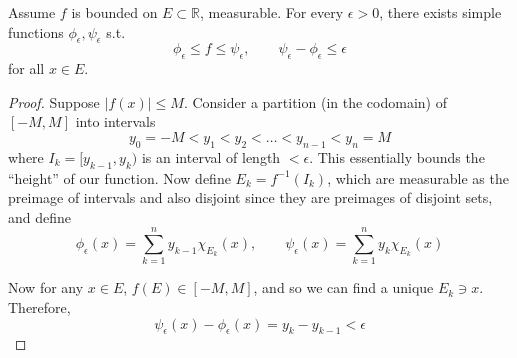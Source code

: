   \begin{lemma}
    Assume $f$ is bounded on $E \subset \mathbb{R}$, measurable. For every $\epsilon > 0$, there exists simple functions $\phi_\epsilon, \psi_\epsilon$ s.t. 
    \begin{equation}
      \phi_\epsilon \leq f \leq \psi_\epsilon, \qquad \psi_\epsilon - \phi_\epsilon \leq \epsilon
    \end{equation}
    for all $x \in E$. 
  \end{lemma}
  \begin{proof}
    Suppose $|f(x)| \leq M$. Consider a partition (in the codomain) of $[-M, M]$ into intervals 
    \begin{equation}
      y_0 = -M < y_1 < y_2 < \ldots < y_{n-1} < y_n = M
    \end{equation}
    where $I_k = [y_{k-1}, y_k)$ is an interval of length $< \epsilon$. This essentially bounds the ``height'' of our function. Now define $E_k = f^{-1} (I_k)$, which are measurable as the preimage of intervals and also disjoint since they are preimages of disjoint sets, and define 
    \begin{equation}
      \phi_\epsilon(x) = \sum_{k=1}^n y_{k-1} \chi_{E_k} (x) , \qquad \psi_\epsilon (x) = \sum_{k=1}^n y_k \chi_{E_k} (x) 
    \end{equation}

    Now for any $x \in E$, $f(E) \in [-M, M]$, and so we can find a unique $E_k \ni x$. Therefore, 
    \begin{equation}
      \psi_\epsilon (x) - \phi_\epsilon(x) = y_k - y_{k-1} < \epsilon 
    \end{equation}
  \end{proof}

